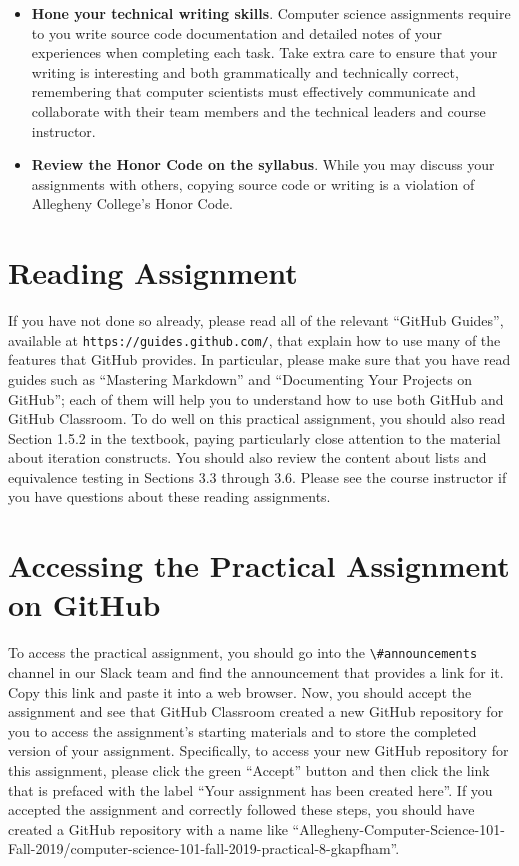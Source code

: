 \documentclass[11pt]{article}
\newcommand{\url}[1]{\lstinline{#1}}
\newcommand{\channel}[1]{\lstinline{#1}}
\begin{document}
\begin{itemize}
\item {\bf Hone your technical writing skills}. Computer science assignments
  require to you write source code documentation and detailed notes of your
  experiences when completing each task. Take extra care to ensure that your
  writing is interesting and both grammatically and technically correct,
  remembering that computer scientists must effectively communicate and
  collaborate with their team members and the technical leaders and course
  instructor.

\item {\bf Review the Honor Code on the syllabus}. While you may discuss your
  assignments with others, copying source code or writing is a violation of
  Allegheny College's Honor Code.

\end{itemize}

\vspace*{-.2in}

\section*{Reading Assignment}

If you have not done so already, please read all of the relevant ``GitHub
Guides'', available at \url{https://guides.github.com/}, that explain how to use
many of the features that GitHub provides. In particular, please make sure that
you have read guides such as ``Mastering Markdown'' and ``Documenting Your
Projects on GitHub''; each of them will help you to understand how to use both
GitHub and GitHub Classroom. To do well on this practical assignment, you
should also read Section 1.5.2 in the textbook, paying particularly close
attention to the material about iteration constructs. You should also review the
content about lists and equivalence testing in Sections 3.3 through 3.6. Please
see the course instructor if you have questions about these reading assignments.

\section*{Accessing the Practical Assignment on GitHub}

To access the practical assignment, you should go into the
\channel{\#announcements} channel in our Slack team and find the announcement
that provides a link for it. Copy this link and paste it into a web browser.
Now, you should accept the assignment and see that GitHub Classroom created a
new GitHub repository for you to access the assignment's starting materials and
to store the completed version of your assignment. Specifically, to access your
new GitHub repository for this assignment, please click the green ``Accept''
button and then click the link that is prefaced with the label ``Your assignment
has been created here''. If you accepted the assignment and correctly followed
these steps, you should have created a GitHub repository with a name like
``Allegheny-Computer-Science-101-Fall-2019/computer-science-101-fall-2019-practical-8-gkapfham''.
\end{document}
